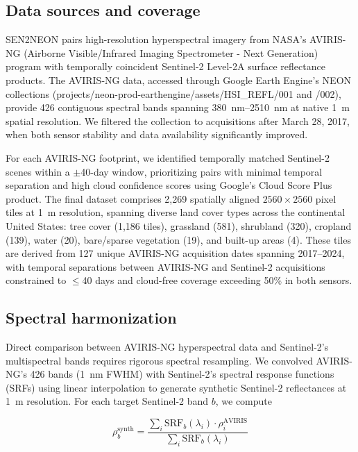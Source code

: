 \documentclass[journal]{IEEEtran}
\begin{document}
    \subsection{Data sources and coverage}
        SEN2NEON pairs high-resolution hyperspectral imagery from NASA's AVIRIS-NG (Airborne Visible/Infrared Imaging Spectrometer - Next Generation) program with temporally coincident Sentinel-2 Level-2A surface reflectance products. The AVIRIS-NG data, accessed through Google Earth Engine's NEON collections (projects/neon-prod-earthengine/assets/HSI\_REFL/001 and /002), provide 426 contiguous spectral bands spanning \SI{380}{nm}--\SI{2510}{nm} at native \SI{1}{m} spatial resolution. We filtered the collection to acquisitions after March 28, 2017, when both sensor stability and data availability significantly improved.
        
        For each AVIRIS-NG footprint, we identified temporally matched Sentinel-2 scenes within a $\pm$40-day window, prioritizing pairs with minimal temporal separation and high cloud confidence scores using Google's Cloud Score Plus product. The final dataset comprises 2,269 spatially aligned $2560\times2560$ pixel tiles at \SI{1}{m} resolution, spanning diverse land cover types across the continental United States: tree cover (1,186 tiles), grassland (581), shrubland (320), cropland (139), water (20), bare/sparse vegetation (19), and built-up areas (4). These tiles are derived from 127 unique AVIRIS-NG acquisition dates spanning 2017--2024, with temporal separations between AVIRIS-NG and Sentinel-2 acquisitions constrained to $\leq$40 days and cloud-free coverage exceeding 50\% in both sensors.
        
        
    \subsection{Spectral harmonization}
    
        Direct comparison between AVIRIS-NG hyperspectral data and Sentinel-2's multispectral bands requires rigorous spectral resampling. We convolved AVIRIS-NG's 426 bands (\SI{1}{nm} FWHM) with Sentinel-2's spectral response functions (SRFs) using linear interpolation to generate synthetic Sentinel-2 reflectances at \SI{1}{m} resolution. For each target Sentinel-2 band $b$, we compute
        
        \begin{equation}
        \rho_b^{\text{synth}} = \frac{\sum_{i} \text{SRF}_b(\lambda_i) \cdot \rho_i^{\text{AVIRIS}}}{\sum_{i} \text{SRF}_b(\lambda_i)}
        \end{equation}
        
\end{document}
